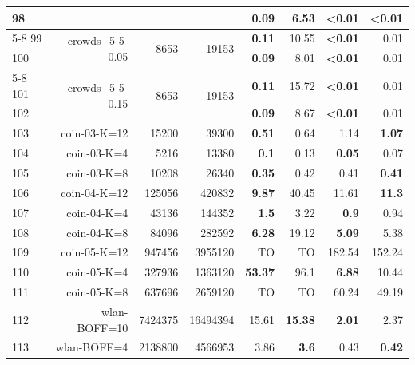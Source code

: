 \begin{longtable}{lrr@{\hskip 12pt}r@{\hskip 12pt}r@{\hskip 12pt}r@{\hskip 12pt}r@{\hskip 12pt}r}
98 &  &  &  & \textbf{0.09} & 6.53 & \textbf{<0.01} & \textbf{<0.01} \\
\cmidrule{5-8}
99 & \multirow{2}{*}{crowds\_5-5-0.05} & \multirow{2}{*}{8653} & \multirow{2}{*}{19153} & \textbf{0.11} & 10.55 & \textbf{<0.01} & 0.01 \\
100 &  &  &  & \textbf{0.09} & 8.01 & \textbf{<0.01} & 0.01 \\
\cmidrule{5-8}
101 & \multirow{2}{*}{crowds\_5-5-0.15} & \multirow{2}{*}{8653} & \multirow{2}{*}{19153} & \textbf{0.11} & 15.72 & \textbf{<0.01} & 0.01 \\
102 &  &  &  & \textbf{0.09} & 8.67 & \textbf{<0.01} & 0.01 \\
\midrule
103 & \multirow{1}{*}{coin-03-K=12} & \multirow{1}{*}{15200} & \multirow{1}{*}{39300} & \textbf{0.51} & 0.64 & 1.14 & \textbf{1.07} \\
104 & \multirow{1}{*}{coin-03-K=4} & \multirow{1}{*}{5216} & \multirow{1}{*}{13380} & \textbf{0.1} & 0.13 & \textbf{0.05} & 0.07 \\
105 & \multirow{1}{*}{coin-03-K=8} & \multirow{1}{*}{10208} & \multirow{1}{*}{26340} & \textbf{0.35} & 0.42 & 0.41 & \textbf{0.41} \\
106 & \multirow{1}{*}{coin-04-K=12} & \multirow{1}{*}{125056} & \multirow{1}{*}{420832} & \textbf{9.87} & 40.45 & 11.61 & \textbf{11.3} \\
107 & \multirow{1}{*}{coin-04-K=4} & \multirow{1}{*}{43136} & \multirow{1}{*}{144352} & \textbf{1.5} & 3.22 & \textbf{0.9} & 0.94 \\
108 & \multirow{1}{*}{coin-04-K=8} & \multirow{1}{*}{84096} & \multirow{1}{*}{282592} & \textbf{6.28} & 19.12 & \textbf{5.09} & 5.38 \\
109 & \multirow{1}{*}{coin-05-K=12} & \multirow{1}{*}{947456} & \multirow{1}{*}{3955120} & TO & TO & 182.54 & 152.24 \\
110 & \multirow{1}{*}{coin-05-K=4} & \multirow{1}{*}{327936} & \multirow{1}{*}{1363120} & \textbf{53.37} & 96.1 & \textbf{6.88} & 10.44 \\
111 & \multirow{1}{*}{coin-05-K=8} & \multirow{1}{*}{637696} & \multirow{1}{*}{2659120} & TO & TO & 60.24 & 49.19 \\
112 & \multirow{1}{*}{wlan-BOFF=10} & \multirow{1}{*}{7424375} & \multirow{1}{*}{16494394} & 15.61 & \textbf{15.38} & \textbf{2.01} & 2.37 \\
113 & \multirow{1}{*}{wlan-BOFF=4} & \multirow{1}{*}{2138800} & \multirow{1}{*}{4566953} & 3.86 & \textbf{3.6} & 0.43 & \textbf{0.42} \\

\end{longtable}
